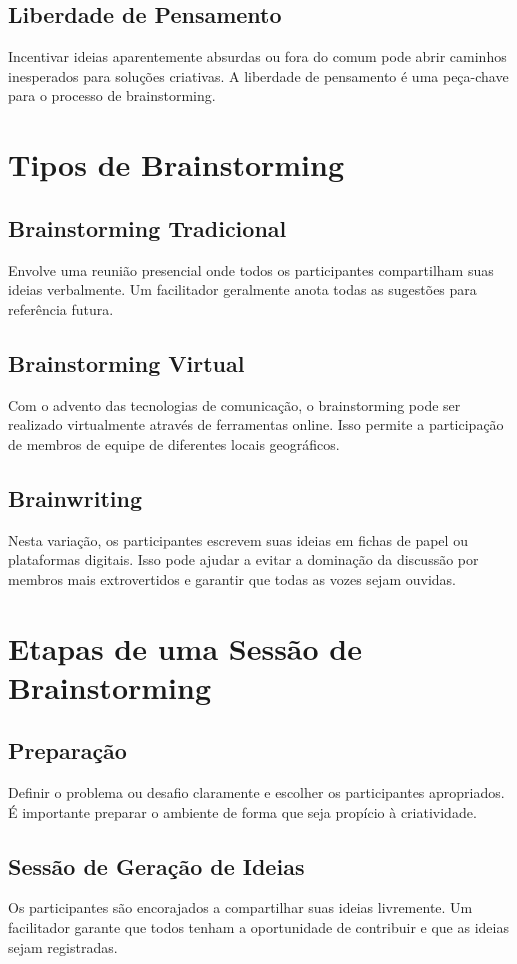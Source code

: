 \documentclass{ufersa}
\begin{document}
\subsection{Liberdade de Pensamento}
Incentivar ideias aparentemente absurdas ou fora do comum pode abrir caminhos inesperados para soluções criativas. A liberdade de pensamento é uma peça-chave para o processo de brainstorming.

\section{Tipos de Brainstorming}
\subsection{Brainstorming Tradicional}
Envolve uma reunião presencial onde todos os participantes compartilham suas ideias verbalmente. Um facilitador geralmente anota todas as sugestões para referência futura.

\subsection{Brainstorming Virtual}
Com o advento das tecnologias de comunicação, o brainstorming pode ser realizado virtualmente através de ferramentas online. Isso permite a participação de membros de equipe de diferentes locais geográficos.

\subsection{Brainwriting}
Nesta variação, os participantes escrevem suas ideias em fichas de papel ou plataformas digitais. Isso pode ajudar a evitar a dominação da discussão por membros mais extrovertidos e garantir que todas as vozes sejam ouvidas.

\section{Etapas de uma Sessão de Brainstorming}
\subsection{Preparação}
Definir o problema ou desafio claramente e escolher os participantes apropriados. É importante preparar o ambiente de forma que seja propício à criatividade.

\subsection{Sessão de Geração de Ideias}
Os participantes são encorajados a compartilhar suas ideias livremente. Um facilitador garante que todos tenham a oportunidade de contribuir e que as ideias sejam registradas.
\end{document}
